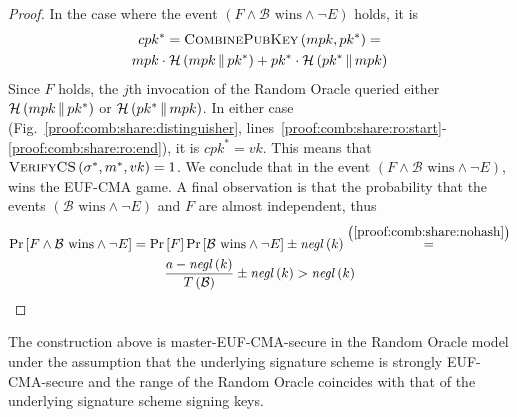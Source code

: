 \begin{proof}
      In the case where the event $\left(F \wedge \mathcal{B} \text{ wins}
      \wedge \neg E\right)$ holds, it is
      \begin{gather*}
        cpk^* = \textsc{CombinePubKey}\left(mpk, pk^*\right) = \\
        mpk \cdot \mathcal{H}\left(mpk \,\|\, pk^*\right) + pk^* \cdot
        \mathcal{H}\left(pk^* \,\|\, mpk\right)
      \end{gather*}
      Since $F$ holds, the $j$th invocation of the Random Oracle queried either
      $\mathcal{H}\left(mpk \,\|\, pk^*\right)$ or $\mathcal{H}\left(pk^*
      \,\|\, mpk\right)$. In either case
      (Fig.~\ref{proof:comb:share:distinguisher},
      lines~\ref{proof:comb:share:ro:start}-\ref{proof:comb:share:ro:end}), it
      is $cpk^* = vk$. This means that $\textsc{VerifyCS}\left(\sigma^*, m^*,
      vk\right) = 1$. We conclude that in the event $\left(F \wedge \mathcal{B}
      \text{ wins} \wedge \neg E\right)$, \adversary{} wins the \textsf{EUF-CMA}
      game. A final observation is that the probability that the events
      $\left(\mathcal{B} \text{ wins} \wedge \neg E\right)$ and $F$ are almost
      independent, thus
      \begin{gather*}
        \Pr\left[F \wedge \mathcal{B} \text{ wins} \wedge \neg E\right] =
        \Pr\left[F\right] \Pr\left[\mathcal{B} \text{ wins} \wedge \neg E\right]
        \pm \mathit{negl}\left(k\right)
        \overset{\left(\ref{proof:comb:share:nohash}\right)}{=} \\
        \frac{a - \mathit{negl}\left(k\right)}{T\left(\mathcal{B}\right)} \pm
        \mathit{negl}\left(k\right) > \mathit{negl}\left(k\right)
      \end{gather*}
    \end{proof}

    \begin{lemma}
      \label{lemma:comb:master}
      The construction above is \textsf{master-EUF-CMA}-secure in the Random
      Oracle model under the assumption that the underlying signature scheme is
      strongly \textsf{EUF-CMA}-secure and the range of the Random Oracle
      coincides with that of the underlying signature scheme signing keys.
    \end{lemma}

